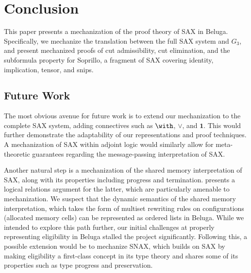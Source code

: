 \section{Conclusion}
\label{section:conclusion}

This paper presents a mechanization of the proof theory of SAX in Beluga.
Specifically, we mechanize the translation between the full SAX system and
$G_3$, and present mechanized proofs of cut admissibility, cut elimination,
and the subformula property for Soprillo, a fragment of SAX covering
identity, implication, tensor, and snips.

\subsection{Future Work}

The most obvious avenue for future work is to extend our mechanization to the
complete SAX system, adding connectives such as $\with$, $\lor$, and
$\mathbf{1}$. This would further demonstrate the adaptability of our
representations and proof techniques. A mechanization of SAX within adjoint
logic would similarly allow for meta-theoretic guarantees regarding the
message-passing interpretation of SAX.

Another natural step is a mechanization of the shared memory interpretation of
SAX, along with its properties including progress and termination.
\cite{DeYoung2020} presents a logical relations argument for the latter, which
are particularly amenable to mechanization. We suspect that the dynamic
semantics of the shared memory interpretation, which takes the form of multiset
rewriting rules on configurations (allocated memory cells) can be represented as
ordered lists in Beluga. While we intended to explore this path further, our
initial challenges at properly representing eligibility in Beluga stalled the
project significantly. Following this, a possible extension would be to
mechanize SNAX, which builds on SAX by making eligibility a first-class concept
in its type theory and shares some of its properties such as type progress and
preservation.
